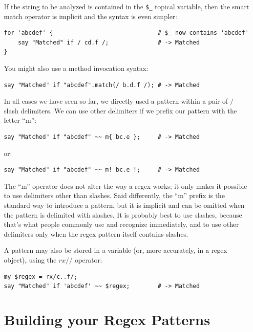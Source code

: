 If the string to be analyzed is contained in the \verb'$_' 
topical variable, then the smart match operator is implicit 
and the syntax is even simpler:

\begin{verbatim}
for 'abcdef' {                              # $_ now contains 'abcdef'
    say "Matched" if / cd.f /;              # -> Matched
}
\end{verbatim}
%

You might also use a method invocation syntax:
\begin{verbatim}
say "Matched" if "abcdef".match(/ b.d.f /); # -> Matched
\end{verbatim}
%

In all cases we have seen so far, we directly used a pattern 
within a pair of $/$ slash delimiters. We can use other 
delimiters if we prefix our pattern with the letter ``m'':

\begin{verbatim}
say "Matched" if "abcdef" ~~ m{ bc.e };     # -> Matched
\end{verbatim}
%

or:
\begin{verbatim}
say "Matched" if "abcdef" ~~ m! bc.e !;     # -> Matched
\end{verbatim}
%

The ``m'' operator does not alter the way a regex works; it 
only makes it possible to use delimiters other than slashes. 
Said differently, the ``m'' prefix is the standard way to 
introduce a pattern, but it is implicit and can be omitted 
when the pattern is delimited with slashes. It is probably best 
to use slashes, because that's what people commonly use and 
recognize immediately, and to use other delimiters only when 
the regex pattern itself contains slashes.

A pattern may also be stored in a variable (or, more 
accurately, in a regex object), using the $rx//$ operator:

\begin{verbatim}
my $regex = rx/c..f/;
say "Matched" if 'abcdef' ~~ $regex;        # -> Matched
\end{verbatim}
%


\section{Building your Regex Patterns}
\label{pattern}

